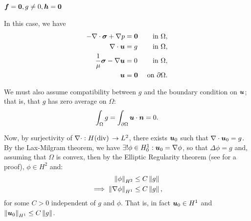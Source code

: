 \subsubsection{$\vect{f} = \vect{0}, g \neq 0,\NVRtensor{h}=\NVRtensor{0}$} In this case, we have
\begin{align}
- \NVRdiv \NVRtensor{\sigma} + \NVRgrad p &= \vect{0} & \text{ in } \Omega, \label{NVR:eq:gstrongfirst} \\
\NVRdiv \vect{u} &= g & \text{ in } \Omega, \\
\frac{1}{\mu} \NVRtensor{\sigma} - \NVRgrad \vect{u} &= 0 & \text{ in } \Omega, \label{NVR:eq:gstrongsigmadef}\\
\vect{u} &= \vect{0} & \text{ on } \partial\Omega.\label{NVR:eq:gstronglast}
\end{align}

We must also assume compatibility between $g$ and the boundary condition on $\vect{u}$; that is, that $g$ has zero average on $\Omega$:
\begin{align*}
\int_{\Omega} g = \int_{\partial \Omega} \vect{u} \cdot \vect{n} = 0.
\end{align*}

Now, by surjectivity of $\NVRdiv : \NVRHdiv \rightarrow L^{2}$, there exists $\vect{u}_{0}$ such that $\NVRdiv \vect{u}_{0} = g$.  By the Lax-Milgram theorem, we have $\exists ! \phi \in H^{1}_{0} : \vect{u}_{0} = \NVRgrad \phi$, so that $\Delta \phi = g$ and, assuming that $\Omega$ is convex, then by the Elliptic Regularity theorem (see \cite[p. 214]{Folland} for a proof), $\phi \in H^{2}$ and:
\begin{align*}
\norm{\phi}_{H^{2}} &\leq C \norm{g}\\ %
\implies \norm{\NVRgrad \phi}_{H^{1}} &\leq C \norm{g},
\end{align*}
for some $C > 0$ independent of $g$ and $\phi$.  That is, in fact $\vect{u}_{0} \in H^{1}$ and $\norm{ \vect{u}_{0} }_{H^{1}} \leq C \norm{g}$.

